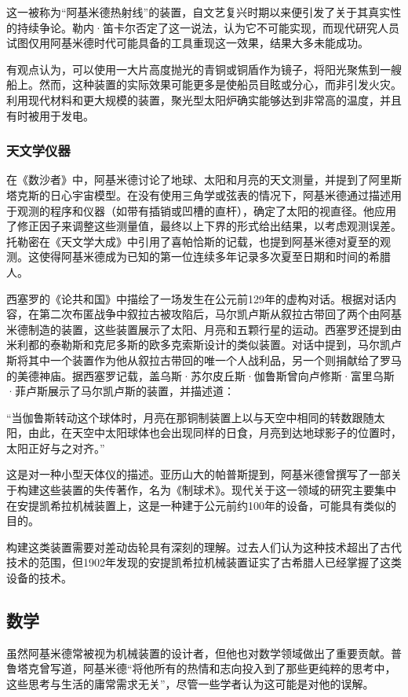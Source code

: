 这一被称为“阿基米德热射线”的装置，自文艺复兴时期以来便引发了关于其真实性的持续争论。勒内·笛卡尔否定了这一说法，认为它不可能实现，而现代研究人员试图仅用阿基米德时代可能具备的工具重现这一效果，结果大多未能成功。  

有观点认为，可以使用一大片高度抛光的青铜或铜盾作为镜子，将阳光聚焦到一艘船上。然而，这种装置的实际效果可能更多是使船员目眩或分心，而非引发火灾。利用现代材料和更大规模的装置，聚光型太阳炉确实能够达到非常高的温度，并且有时被用于发电。
\subsubsection{天文学仪器}
在《数沙者》中，阿基米德讨论了地球、太阳和月亮的天文测量，并提到了阿里斯塔克斯的日心宇宙模型。在没有使用三角学或弦表的情况下，阿基米德通过描述用于观测的程序和仪器（如带有插销或凹槽的直杆），确定了太阳的视直径。他应用了修正因子来调整这些测量值，最终以上下界的形式给出结果，以考虑观测误差。托勒密在《天文学大成》中引用了喜帕恰斯的记载，也提到阿基米德对夏至的观测。这使得阿基米德成为已知的第一位连续多年记录多次夏至日期和时间的希腊人。  

西塞罗的《论共和国》中描绘了一场发生在公元前129年的虚构对话。根据对话内容，在第二次布匿战争中叙拉古被攻陷后，马尔凯卢斯从叙拉古带回了两个由阿基米德制造的装置，这些装置展示了太阳、月亮和五颗行星的运动。西塞罗还提到由米利都的泰勒斯和克尼多斯的欧多克索斯设计的类似装置。对话中提到，马尔凯卢斯将其中一个装置作为他从叙拉古带回的唯一个人战利品，另一个则捐献给了罗马的美德神庙。据西塞罗记载，盖乌斯·苏尔皮丘斯·伽鲁斯曾向卢修斯·富里乌斯·菲卢斯展示了马尔凯卢斯的装置，并描述道：  

“当伽鲁斯转动这个球体时，月亮在那铜制装置上以与天空中相同的转数跟随太阳，由此，在天空中太阳球体也会出现同样的日食，月亮到达地球影子的位置时，太阳正好与之对齐。”

这是对一种小型天体仪的描述。亚历山大的帕普斯提到，阿基米德曾撰写了一部关于构建这些装置的失传著作，名为《制球术》。现代关于这一领域的研究主要集中在安提凯希拉机械装置上，这是一种建于公元前约100年的设备，可能具有类似的目的。  

构建这类装置需要对差动齿轮具有深刻的理解。过去人们认为这种技术超出了古代技术的范围，但1902年发现的安提凯希拉机械装置证实了古希腊人已经掌握了这类设备的技术。
\subsection{数学} 
虽然阿基米德常被视为机械装置的设计者，但他也对数学领域做出了重要贡献。普鲁塔克曾写道，阿基米德“将他所有的热情和志向投入到了那些更纯粹的思考中，这些思考与生活的庸常需求无关”，尽管一些学者认为这可能是对他的误解。  
